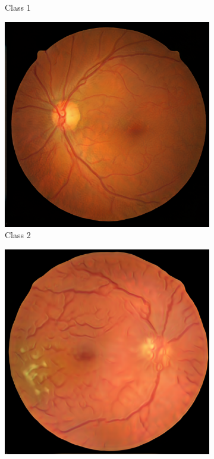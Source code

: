 \documentclass[sigconf,nonacm]{acmart}
\begin{document}
\begin{figure}[H]
\begin{subfigure}{0.18\linewidth}
\caption{Class 1}
\end{subfigure}
\begin{subfigure}{0.18\linewidth}
\centering
\includegraphics[width=0.9\linewidth]{fake-class2.png}
\caption{Class 2}
\end{subfigure}
\begin{subfigure}{0.18\linewidth}
\centering
\includegraphics[width=0.9\linewidth]{fake-class3.png}

\end{subfigure}
\end{figure}
\end{document}
